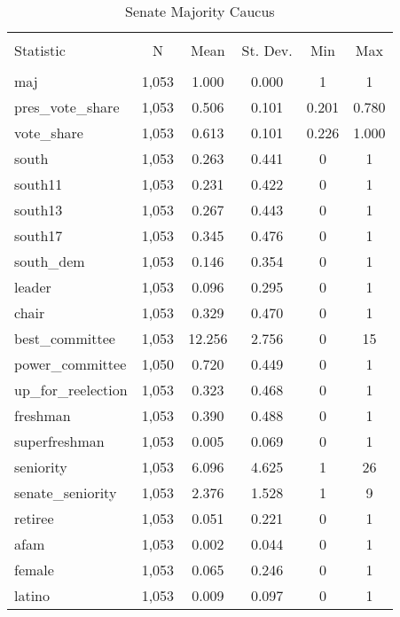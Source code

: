 \documentclass[12pt]{article}
\begin{document}


\begin{table}[ht] \centering 
	\caption{Senate Majority Caucus} 
	\label{} 
	\begin{tabular}{@{\extracolsep{5pt}}lccccc} 
		\\[-1.8ex]\hline 
		\hline \\[-1.8ex] 
		Statistic & \multicolumn{1}{c}{N} & \multicolumn{1}{c}{Mean} & \multicolumn{1}{c}{St. Dev.} & \multicolumn{1}{c}{Min} & \multicolumn{1}{c}{Max} \\ 
		\hline \\[-1.8ex] 
		maj & 1,053 & 1.000 & 0.000 & 1 & 1 \\ 
		pres\_vote\_share & 1,053 & 0.506 & 0.101 & 0.201 & 0.780 \\ 
		vote\_share & 1,053 & 0.613 & 0.101 & 0.226 & 1.000 \\ 
		south & 1,053 & 0.263 & 0.441 & 0 & 1 \\ 
		south11 & 1,053 & 0.231 & 0.422 & 0 & 1 \\ 
		south13 & 1,053 & 0.267 & 0.443 & 0 & 1 \\ 
		south17 & 1,053 & 0.345 & 0.476 & 0 & 1 \\ 
		south\_dem & 1,053 & 0.146 & 0.354 & 0 & 1 \\ 
		leader & 1,053 & 0.096 & 0.295 & 0 & 1 \\ 
		chair & 1,053 & 0.329 & 0.470 & 0 & 1 \\ 
		best\_committee & 1,053 & 12.256 & 2.756 & 0 & 15 \\ 
		power\_committee & 1,050 & 0.720 & 0.449 & 0 & 1 \\ 
		up\_for\_reelection & 1,053 & 0.323 & 0.468 & 0 & 1 \\ 
		freshman & 1,053 & 0.390 & 0.488 & 0 & 1 \\ 
		superfreshman & 1,053 & 0.005 & 0.069 & 0 & 1 \\ 
		seniority & 1,053 & 6.096 & 4.625 & 1 & 26 \\ 
		senate\_seniority & 1,053 & 2.376 & 1.528 & 1 & 9 \\ 
		retiree & 1,053 & 0.051 & 0.221 & 0 & 1 \\ 
		afam & 1,053 & 0.002 & 0.044 & 0 & 1 \\ 
		female & 1,053 & 0.065 & 0.246 & 0 & 1 \\ 
		latino & 1,053 & 0.009 & 0.097 & 0 & 1 \\ 

\end{tabular}
\end{table}
\end{document}
